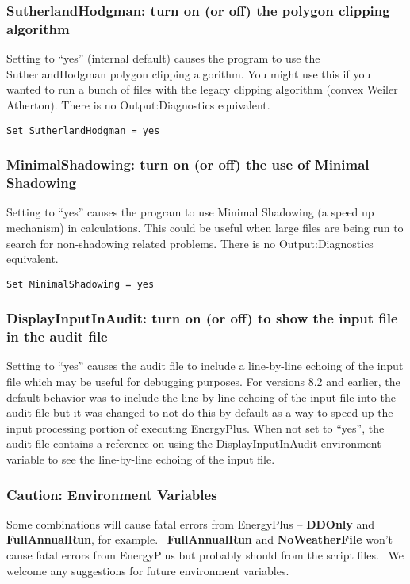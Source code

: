 \subsubsection{SutherlandHodgman: turn on (or off) the polygon clipping algorithm}\label{sutherlandhodgman-turn-on-or-off-the-polygon-clipping-algorithm}

Setting to ``yes'' (internal default) causes the program to use the SutherlandHodgman polygon clipping algorithm. You might use this if you wanted to run a bunch of files with the legacy clipping algorithm (convex Weiler Atherton). There is no Output:Diagnostics equivalent.

\begin{lstlisting}
Set SutherlandHodgman = yes
\end{lstlisting}

\subsubsection{MinimalShadowing: turn on (or off) the use of Minimal Shadowing}\label{minimalshadowing-turn-on-or-off-the-use-of-minimal-shadowing}

Setting to ``yes'' causes the program to use Minimal Shadowing (a speed up mechanism) in calculations. This could be useful when large files are being run to search for non-shadowing related problems. There is no Output:Diagnostics equivalent.

\begin{lstlisting}
Set MinimalShadowing = yes
\end{lstlisting}

\subsubsection{DisplayInputInAudit: turn on (or off) to show the input file in the audit file}\label{displayinputinaudit-turn-on-or-off-to-show-the-input-file-in-the-audit-file}

Setting to ``yes'' causes the audit file to include a line-by-line echoing of the input file which may be useful for debugging purposes. For versions 8.2 and earlier, the default behavior was to include the line-by-line echoing of the input file into the audit file but it was changed to not do this by default as a way to speed up the input processing portion of executing EnergyPlus. When not set to ``yes'', the audit file contains a reference on using the DisplayInputInAudit environment variable to see the line-by-line echoing of the input file.

\subsubsection{Caution: Environment Variables}\label{caution-environment-variables}

Some combinations will cause fatal errors from EnergyPlus -- \textbf{DDOnly} and \textbf{FullAnnualRun}, for example.~ \textbf{FullAnnualRun} and \textbf{NoWeatherFile} won't cause fatal errors from EnergyPlus but probably should from the script files.~ We welcome any suggestions for future environment variables.
